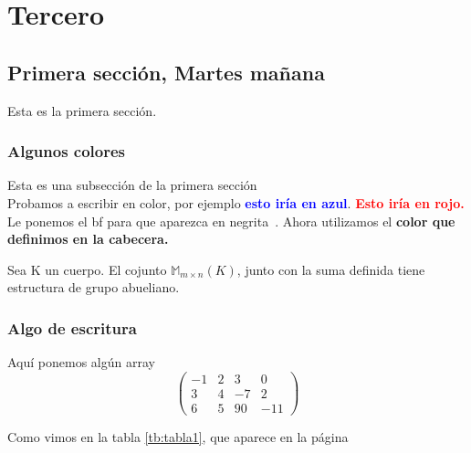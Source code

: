 \chapter*{Tercero}

\section[Repetido del primero]{Primera sección, Martes mañana}
Esta es la primera sección.
\subsection[Colores]{Algunos colores}
Esta es una subsección de la primera sección\\
Probamos a escribir en color, por ejemplo \textcolor{blue}{\bf esto iría en azul}. \textcolor{red}{\bf Esto iría en rojo.} Le ponemos el bf para que aparezca en negrita~. Ahora utilizamos el \textcolor{moradito}{\bf color que definimos en la cabecera.}


\begin{lema}
	Sea K un cuerpo. El cojunto $\mathbb{M}_{m\times n}(K)$, junto con la suma definida tiene estructura de grupo abueliano.
\end{lema}


\subsection[Escritura]{Algo de escritura}
Aquí ponemos algún array
\[
\left (
\begin{array}{rrr|r} 
	-1 & 2 &  3 &   0 \\ 
	3 & 4 & -7 &   2\\
	6 & 5 & 90 & -11
\end{array} 
\right )
\]

Como vimos en la tabla \ref{tb:tabla1}, que aparece en la página \pageref{tb:tabla1}


